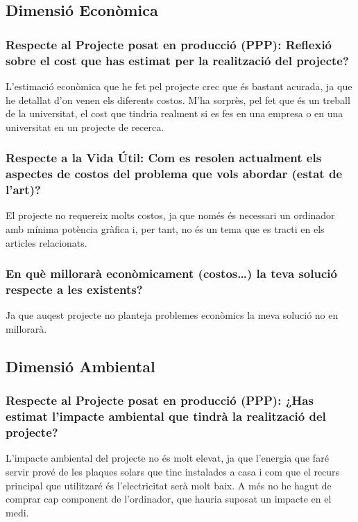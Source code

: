 \documentclass{article}
\begin{document}
\subsection{Dimensió Econòmica}

\subsubsection{Respecte al Projecte posat en producció (PPP): Reflexió sobre el cost que has estimat per la realització del projecte?}

L'estimació econòmica que he fet pel projecte crec que és bastant acurada, ja que he detallat d'on venen els diferents costos. M'ha sorprès, pel fet que és un treball de la universitat, el cost que tindria realment si es fes en una empresa o en una universitat en un projecte de recerca.

\subsubsection{Respecte a la Vida Útil: Com es resolen actualment els aspectes de costos del problema que vols abordar (estat de l’art)?}

El projecte no requereix molts costos, ja que només és necessari un ordinador amb mínima potència gràfica i, per tant, no és un tema que es tracti en els articles relacionats.

\subsubsection{En què millorarà econòmicament (costos…) la teva solució respecte a les existents?}

Ja que auqest projecte no planteja problemes econòmics la meva solució no en millorarà.

\subsection{Dimensió Ambiental}

\subsubsection{Respecte al Projecte posat en producció (PPP): ¿Has estimat l'impacte ambiental que tindrà la realització del projecte?}

L'impacte ambiental del projecte no és molt elevat, ja que l'energia que faré servir prové de les plaques solars que tinc instalades a casa i com que el recurs principal que utilitzaré és l'electricitat serà molt baix. A més no he hagut de comprar cap component de l'ordinador, que hauria suposat un impacte en el medi.
\end{document}
